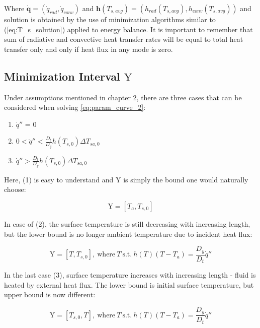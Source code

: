 \documentclass[10pt, letterpaper]{article}
\begin{document}
	Where $\mathbf{\dot{q}} = (\dot{q}_{rad}, \dot{q}_{conv})$ and $\mathbf{h}(T_{s, avg}) = (h_{rad}(T_{s, avg}), h_{conv}(T_{s, avg}))$ and solution is obtained by the use of minimization algorithms similar to (\ref{eq:T_s_solution}) applied to energy balance. It is important to remember that sum of radiative and convective heat transfer rates will be equal to total heat transfer only and only if heat flux in any mode is zero.

	\subsection{Minimization Interval $\text{Y}$}
	\label{sec:interval y}

	Under assumptions mentioned in chapter 2, there are three cases that can be considered when solving \ref{eq:param_curve_2}:

	\begin{enumerate}
		\item $\dot{q}''$ = 0
		\item $0 < \dot{q}'' < \frac{D_{t}}{D_{y}} h(T_{s,0}) \Delta{T_{sa,0}}$
		\item $\dot{q}'' > \frac{D_{t}}{D_{y}} h(T_{s,0}) \Delta{T_{sa,0}}$
	\end{enumerate}

	Here, (1) is easy to understand and $\text{Y}$ is simply the bound one would naturally choose:

	\begin{equation}
		\text{Y} = [T_{a}, T_{s,0}]
	\end{equation}

	In case of (2), the surface temperature is still decreasing with increasing length, but the lower bound is no longer ambient temperature due to incident heat flux:

	\begin{equation}
		\text{Y} = [T, T_{s,0}],\ \text{where}\ T\ \text{s.t.}\ h(T)(T-T_{a}) = \frac{D_{y}}{D_{t}} \dot{q}''
	\end{equation}

	In the last case (3), surface temperature increases with increasing length - fluid is heated by external heat flux. The lower bound is initial surface temperature, but upper bound is now different:

	\begin{equation}
		\text{Y} = [T_{s,0}, T],\ \text{where}\ T\ \text{s.t.}\ h(T)(T-T_{a}) = \frac{D_{y}}{D_{t}} \dot{q}''
	\end{equation}
	
\end{document}
